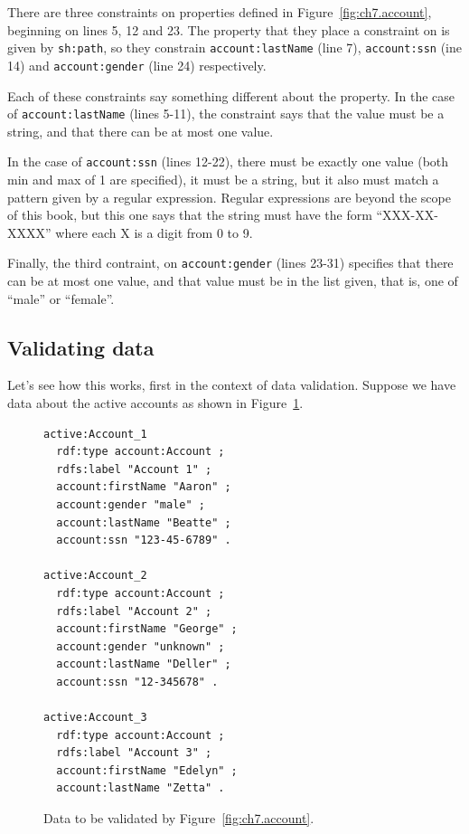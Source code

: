 There are three constraints on properties defined in Figure~\ref{fig:ch7.account}, beginning on lines 5, 12 and 23.  The property that they place a constraint on is given by \texttt{sh:path}, so they constrain \texttt{account:lastName} (line 7), \texttt{account:ssn} (ine 14)  and \texttt{account:gender} (line 24) respectively.

Each of these constraints say something different about the property.  
In the case of \texttt{account:lastName} (lines 5-11), the constraint says 
that the value must be a string,  and that there can be at most one value.

In the case of \texttt{account:ssn} (lines 12-22), there must be exactly one value 
(both min and max of 1 are specified), it must be a string, but it also must match
a pattern given by a regular expression.  Regular expressions are beyond the scope
of this book, but this one says that the string must have the form ``XXX-XX-XXXX''
where each X is a digit from 0 to 9.

Finally, the third contraint, on \texttt{account:gender} (lines 23-31) specifies that
there can be at most one value, and that value must be in the list given, that is, one
of ``male'' or ``female''.

\hypertarget{validating-data}{%
\subsection{Validating data}\label{validating-data}}


Let's see how this works, first in the context
of data validation.  Suppose we have data about the active accounts as shown in
Figure~\ref{fig:ch7.data}.


\begin{figure}
  \begin{lstlisting}
active:Account_1
  rdf:type account:Account ;
  rdfs:label "Account 1" ;
  account:firstName "Aaron" ;
  account:gender "male" ;
  account:lastName "Beatte" ;
  account:ssn "123-45-6789" .

active:Account_2
  rdf:type account:Account ;
  rdfs:label "Account 2" ;
  account:firstName "George" ;
  account:gender "unknown" ;
  account:lastName "Deller" ;
  account:ssn "12-345678" .

active:Account_3
  rdf:type account:Account ;
  rdfs:label "Account 3" ;
  account:firstName "Edelyn" ;
  account:lastName "Zetta" .
  \end{lstlisting}
\label{fig:ch7.data}
\caption{Data to be validated by Figure~\protect\ref{fig:ch7.account}.}
\end{figure}

